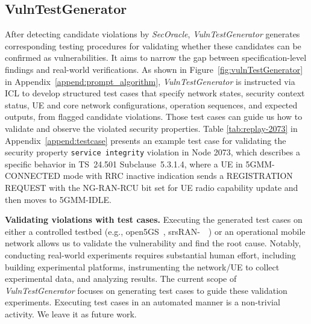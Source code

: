 \subsection{VulnTestGenerator}

After detecting 
candidate violations by \textit{SecOracle}, \textit{VulnTestGenerator} generates corresponding testing procedures for validating whether these candidates can be confirmed as vulnerabilities.  
It aims to narrow the gap between specification-level findings and real-world verifications. As shown in Figure~\ref{fig:vulnTestGenerator} in Appendix~\ref{append:prompt_algorithm}, \textit{VulnTestGenerator} is instructed via ICL to develop structured test cases that specify network states, security context status, UE and core network configurations, operation sequences, and expected outputs, from flagged candidate violations. Those test cases can guide us how to validate and observe the violated security properties. 
Table \ref{tab:replay-2073} in Appendix~\ref{append:testcase} presents an example test case for validating the security property \texttt{service integrity} violation in Node 2073,  
which describes a specific behavior in TS~24.501 Subclause~5.3.1.4, where a UE in 5GMM-CONNECTED mode with RRC inactive indication sends a REGISTRATION REQUEST with the NG-RAN-RCU bit set for UE radio capability update and then moves to 5GMM-IDLE.


\noindent \textbf{Validating violations with test cases.} Executing the generated test cases on either a controlled testbed (e.g., open5GS~\cite{open5gs}, srsRAN-\ ~\cite{srsran}) or an operational mobile network allows us to validate the vulnerability and find the root cause. Notably, conducting real-world experiments requires substantial human effort, including building experimental platforms, instrumenting the network/UE to collect experimental data, and analyzing results. The current scope of \textit{VulnTestGenerator} focuses on generating test cases to guide these validation experiments. Executing test cases in an automated manner is a non-trivial activity. We leave it as future work.     



